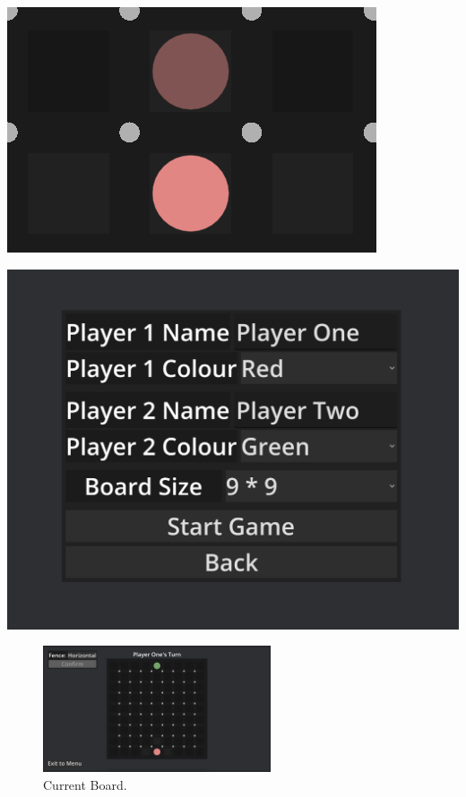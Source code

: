 \documentclass[progress]{cmpreport}
\begin{document}
\begin{minipage}[b]{0.45\textwidth}
    \centering
    \includegraphics[width=\textwidth]{images/pawn_movement.png}
    \label{fig:pawn_movement}
\end{minipage}%
\hfill
\begin{minipage}[b]{0.45\textwidth}
    \centering
    \includegraphics[width=\textwidth]{images/board_options.png}
    \label{fig:options}
\end{minipage}


\begin{figure}[h]
    \centering
    \includegraphics[width=0.6\textwidth]{images/current_board.png}
    \caption{Current Board.}
    \label{fig:board}
\end{figure}
\end{document}
